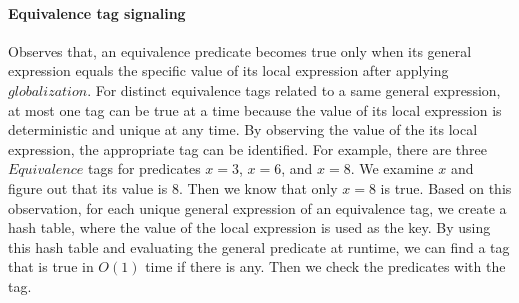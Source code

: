 \documentclass[preprint]{sigplanconf}
\begin{document}
\paragraph{Equivalence tag signaling}
Observes that, an equivalence predicate becomes true only when its general
expression equals the specific value of its local expression after applying
$globalization$. For distinct equivalence tags related to a same general 
expression, at most one tag can be true at a time because the value of its
local expression is deterministic and unique at any time. By 
observing the value of the its local expression, the appropriate tag can be 
identified. For example, there are three $Equivalence$ tags for
predicates $x = 3$, $x = 6$, and $x = 8$. We examine $x$ and figure out that
its value is $8$. Then we know that only $x = 8$ is true. Based on this 
observation, for each unique general expression of an equivalence tag, we 
create a hash table, where the value of the local expression is used as the 
key. By using this 
hash table and evaluating the general predicate at runtime, we can find a
tag that is true in $O(1)$ time if there is any. Then we check the predicates 
with the tag. 

\end{document}
